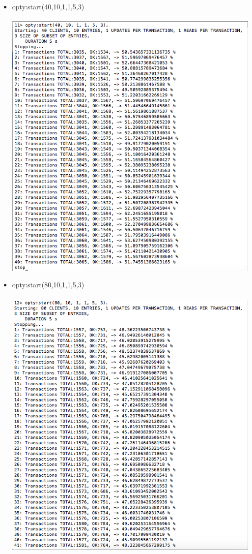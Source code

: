 \documentclass[a4paper, 11pt]{article}
\begin{document}
\begin{itemize}
\newpage
\item opty:start(40,10,1,1,5,3)\\\\
\includegraphics[scale=0.5]{images/exp-i-5.png} \\
\newpage
\item opty:start(80,10,1,1,5,3)\\\\
\includegraphics[scale=0.4]{images/exp-i-6a.png} \\

\end{itemize}
\end{document}
